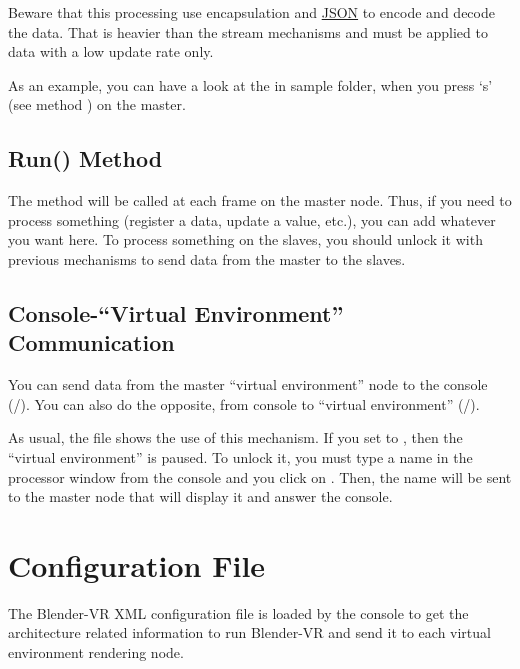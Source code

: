 \documentclass[a4,10pt,openany,oneside]{sphinxmanual}
\begin{document}
Beware that this processing use encapsulation and \href{https://en.wikipedia.org/wiki/JSON}{JSON} to encode and decode the data. That is heavier than the stream mechanisms and must be applied to data with a low update rate only.

As an example, you can have a look at the  in sample folder, when you press `s' (see method ) on the master.


\subsection{Run() Method}
\label{components/processor-file:run-method}
The  method will be called at each frame on the master node. Thus, if you need to process something (register a data, update a value, etc.), you can add whatever you want here. To process something on the slaves, you should unlock it with previous mechanisms to send data from the master to the slaves.


\subsection{Console-``Virtual Environment'' Communication}
\label{components/processor-file:console-virtual-environment-communication}
You can send data from the master ``virtual environment'' node to the console (/). You can also do the opposite, from console to ``virtual environment'' (/).

As usual, the  file shows the use of this mechanism. If you set  to , then the ``virtual environment'' is paused. To unlock it, you must type a name in the processor window from the console and you click on . Then, the name will be sent to the master node that will display it and answer the console.


\section{Configuration File}
\label{components/configuration-file:configuration-file}\label{components/configuration-file::doc}
The Blender-VR XML configuration file is loaded by the console to get the architecture related information to run Blender-VR and send it to each virtual environment rendering node.
\end{document}
